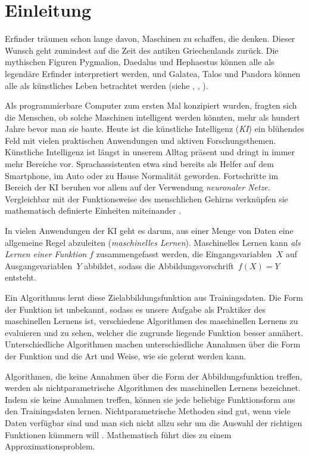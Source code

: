 \chapter*{Einleitung}

Erfinder träumen schon lange davon, Maschinen zu schaffen, die denken. Dieser Wunsch geht zumindest auf die Zeit des antiken Griechenlands zurück. Die mythischen Figuren Pygmalion, Daedalus und Hephaestus können alle als legendäre Erfinder interpretiert werden, und Galatea, Talos und Pandora können alle als künstliches Leben betrachtet werden (siehe \cite{2005metamorphoses}, \cite{sparkes1996red}, \cite{hesiod1996works}).

Als programmierbare Computer zum ersten Mal konzipiert wurden, fragten sich die Menschen, ob solche Maschinen intelligent werden könnten, mehr als hundert Jahre bevor man sie baute. Heute ist die künstliche Intelligenz (\emph{KI}) ein blühendes Feld mit vielen praktischen Anwendungen und aktiven Forschungsthemen. 
Künstliche Intelligenz ist längst in unserem Alltag präsent und dringt in immer mehr Bereiche vor. Sprachassistenten etwa sind bereits als Helfer auf dem Smartphone, im Auto oder zu Hause Normalität geworden. Fortschritte im Bereich der KI beruhen vor allem auf der Verwendung \emph{neuronaler Netze}. Vergleichbar mit der Funktionsweise des menschlichen Gehirns verknüpfen sie mathematisch definierte Einheiten miteinander \cite{goodfellow2016deep}.

In vielen Anwendungen der KI geht es darum, aus einer Menge von Daten eine allgemeine Regel abzuleiten (\emph{maschinelles Lernen}). Maschinelles Lernen kann \emph{als Lernen einer Funktion} $f$ zusammengefasst werden, die Eingangsvariablen~$X$ auf Ausgangsvariablen~$Y$ abbildet, sodass die Abbildungsvorschrift~$f(X) = Y$ entsteht.

Ein Algorithmus lernt diese Zielabbildungsfunktion aus Trainingsdaten.
Die Form der Funktion ist unbekannt, sodass es unsere Aufgabe als Praktiker des maschinellen Lernens ist, verschiedene Algorithmen des maschinellen Lernens zu evaluieren und zu sehen, welcher die zugrunde liegende Funktion besser annähert.
Unterschiedliche Algorithmen machen unterschiedliche Annahmen über die Form der Funktion und die Art und Weise, wie sie gelernt werden kann.

Algorithmen, die keine Annahmen über die Form der Abbildungsfunktion treffen, werden als nichtparametrische Algorithmen des maschinellen Lernens bezeichnet. Indem sie keine Annahmen treffen, können sie jede beliebige Funktionsform aus den Trainingsdaten lernen.
Nichtparametrische Methoden sind gut, wenn viele Daten verfügbar sind und man sich nicht allzu sehr um die Auswahl der richtigen Funktionen kümmern will \cite[Seite~757]{AI}. Mathematisch führt dies zu einem Approximationsproblem. 

